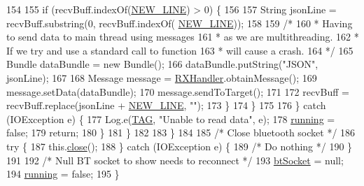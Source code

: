 \begin{DoxyCode}
154 
155                         \textcolor{keywordflow}{if} (recvBuff.indexOf(\hyperlink{classcom_1_1jack_1_1motorbikestatistics_1_1_b_t_connection_aacec2fadb24352fd7fdeae731e3ed412}{NEW\_LINE}) > 0) \{
156 
157                             String jsonLine = recvBuff.substring(0, recvBuff.indexOf(
      \hyperlink{classcom_1_1jack_1_1motorbikestatistics_1_1_b_t_connection_aacec2fadb24352fd7fdeae731e3ed412}{NEW\_LINE}));
158 
159                             \textcolor{comment}{/*}
160 \textcolor{comment}{                             * Having to send data to main thread using messages}
161 \textcolor{comment}{                             * as we are multithreading.}
162 \textcolor{comment}{                             * If we try and use a standard call to function}
163 \textcolor{comment}{                             * will cause a crash.}
164 \textcolor{comment}{                             */}
165                             Bundle dataBundle =  \textcolor{keyword}{new} Bundle();
166                             dataBundle.putString(\textcolor{stringliteral}{"JSON"}, jsonLine);
167 
168                             Message message = \hyperlink{classcom_1_1jack_1_1motorbikestatistics_1_1_b_t_connection_a64fc7b02a2b9f052c6b05842b79b3cdc}{RXHandler}.obtainMessage();
169                             message.setData(dataBundle);
170                             message.sendToTarget();
171 
172                             recvBuff = recvBuff.replace(jsonLine + \hyperlink{classcom_1_1jack_1_1motorbikestatistics_1_1_b_t_connection_aacec2fadb24352fd7fdeae731e3ed412}{NEW\_LINE}, \textcolor{stringliteral}{""});
173                         \}
174                     \}
175 
176                 \} \textcolor{keywordflow}{catch} (IOException e) \{
177                     Log.e(\hyperlink{classcom_1_1jack_1_1motorbikestatistics_1_1_b_t_connection_af9455991fec4de29ffc875eae117a761}{TAG}, \textcolor{stringliteral}{"Unable to read data"}, e);
178                     \hyperlink{classcom_1_1jack_1_1motorbikestatistics_1_1_b_t_connection_a6193b7b92b7f2905a3a43d63db40aba8}{running} = \textcolor{keyword}{false};
179                     \textcolor{keywordflow}{return};
180                 \}
181             \}
182 
183         \}
184 
185         \textcolor{comment}{/* Close bluetooth socket */}
186         \textcolor{keywordflow}{try} \{
187             this.\hyperlink{classcom_1_1jack_1_1motorbikestatistics_1_1_b_t_connection_ac1cd0e85a758db424a57010ac9bb87f0}{close}();
188         \} \textcolor{keywordflow}{catch} (IOException e) \{
189             \textcolor{comment}{/* Do nothing */}
190         \}
191 
192         \textcolor{comment}{/* Null BT socket to show needs to reconnect */}
193         \hyperlink{classcom_1_1jack_1_1motorbikestatistics_1_1_b_t_connection_a0d47f94a35f7c8a07429975446e7b33b}{btSocket} = null;
194         \hyperlink{classcom_1_1jack_1_1motorbikestatistics_1_1_b_t_connection_a6193b7b92b7f2905a3a43d63db40aba8}{running} = \textcolor{keyword}{false};
195     \}
\end{DoxyCode}
